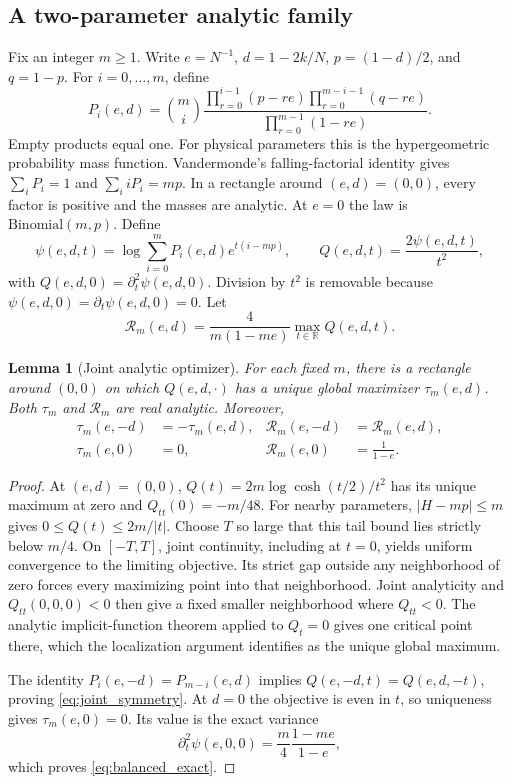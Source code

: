 \documentclass[11pt,a4paper]{article}
\newtheorem{lemma}[theorem]{Lemma}
\begin{document}
\subsection{A two-parameter analytic family}
Fix an integer $m\ge1$. Write $e=N^{-1}$, $d=1-2k/N$, $p=(1-d)/2$, and $q=1-p$. For $i=0,\ldots,m$, define
\begin{equation}\label{eq:analytic_masses}
 P_i(e,d)=\binom mi
 \frac{\prod_{r=0}^{i-1}(p-re)\prod_{r=0}^{m-i-1}(q-re)}
 {\prod_{r=0}^{m-1}(1-re)}.
\end{equation}
Empty products equal one. For physical parameters this is the hypergeometric probability mass function. Vandermonde's falling-factorial identity gives $\sum_iP_i=1$ and $\sum_i iP_i=mp$. In a rectangle around $(e,d)=(0,0)$, every factor is positive and the masses are analytic. At $e=0$ the law is $\mathrm{Binomial}(m,p)$. Define
\[
 \psi(e,d,t)=\log\sum_{i=0}^mP_i(e,d)e^{t(i-mp)},\qquad
 Q(e,d,t)=\frac{2\psi(e,d,t)}{t^2},
\]
with $Q(e,d,0)=\partial_t^2\psi(e,d,0)$. Division by $t^2$ is removable because $\psi(e,d,0)=\partial_t\psi(e,d,0)=0$. Let
\[
 \mathcal R_m(e,d)=\frac{4}{m(1-me)}\max_{t\in\mathbb R}Q(e,d,t).
\]

\begin{lemma}[Joint analytic optimizer]\label{lem:joint_optimizer}
For each fixed $m$, there is a rectangle around $(0,0)$ on which $Q(e,d,\cdot)$ has a unique global maximizer $\tau_m(e,d)$. Both $\tau_m$ and $\mathcal R_m$ are real analytic. Moreover,
\begin{align}
 \tau_m(e,-d)&=-\tau_m(e,d),&
 \mathcal R_m(e,-d)&=\mathcal R_m(e,d),\label{eq:joint_symmetry}\\
 \tau_m(e,0)&=0,&
 \mathcal R_m(e,0)&=\frac1{1-e}.\label{eq:balanced_exact}
\end{align}
\end{lemma}
\begin{proof}
At $(e,d)=(0,0)$, $Q(t)=2m\log\cosh(t/2)/t^2$ has its unique maximum at zero and $Q_{tt}(0)=-m/48$. For nearby parameters, $|H-mp|\le m$ gives $0\le Q(t)\le2m/|t|$. Choose $T$ so large that this tail bound lies strictly below $m/4$. On $[-T,T]$, joint continuity, including at $t=0$, yields uniform convergence to the limiting objective. Its strict gap outside any neighborhood of zero forces every maximizing point into that neighborhood. Joint analyticity and $Q_{tt}(0,0,0)<0$ then give a fixed smaller neighborhood where $Q_{tt}<0$. The analytic implicit-function theorem applied to $Q_t=0$ gives one critical point there, which the localization argument identifies as the unique global maximum.

The identity $P_i(e,-d)=P_{m-i}(e,d)$ implies $Q(e,-d,t)=Q(e,d,-t)$, proving \eqref{eq:joint_symmetry}. At $d=0$ the objective is even in $t$, so uniqueness gives $\tau_m(e,0)=0$. Its value is the exact variance
\[
 \partial_t^2\psi(e,0,0)=\frac m4\frac{1-me}{1-e},
\]
which proves \eqref{eq:balanced_exact}.
\end{proof}
\end{document}
